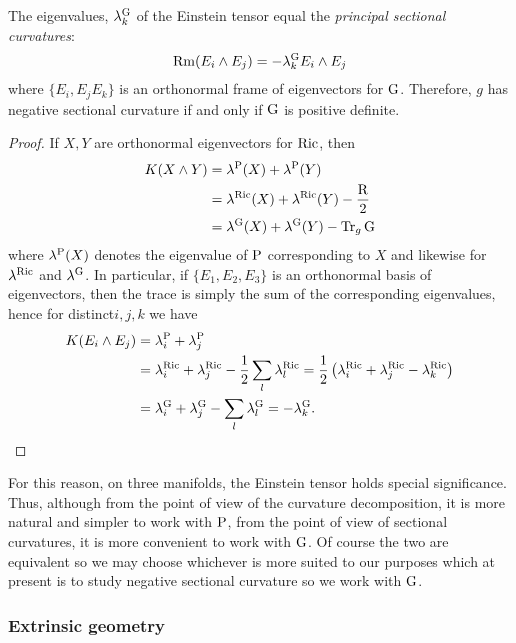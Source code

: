 \documentclass[a4paper, 12pt]{amsart}
\begin{document}
\begin{lemma}
\label{lem:eins_sectional}

The eigenvalues, \(\lambda^{\operatorname{G}}_k\) of the Einstein tensor equal the \emph{principal sectional curvatures}:
\[
\operatorname{Rm} (E_i \wedge E_j) = -\lambda^{\operatorname{G}}_k E_i \wedge E_j
\]
where \(\{E_i, E_j E_k\}\) is an orthonormal frame of eigenvectors for \(\operatorname{G}\). Therefore, \(g\) has negative sectional curvature if and only if \(\operatorname{G}\) is positive definite.
\end{lemma}

\begin{proof}
If \(X, Y\) are orthonormal eigenvectors for \(\operatorname{Ric}\), then
\begin{align*}
K(X \wedge Y) &= \lambda^{\operatorname{P}}(X) + \lambda^{\operatorname{P}}(Y) \\
&= \lambda^{\operatorname{Ric}} (X) + \lambda^{\operatorname{Ric}} (Y) - \frac{\operatorname{R}}{2} \\
&= \lambda^{\operatorname{G}} (X) + \lambda^{\operatorname{G}} (Y) - \operatorname{Tr}_g \operatorname{G} \\
\end{align*}
where \(\lambda^{\operatorname{P}}(X)\) denotes the eigenvalue of \(\operatorname{P}\) corresponding to \(X\) and likewise for \(\lambda^{\operatorname{Ric}}\) and \(\lambda^{\operatorname{G}}\). In particular, if \(\{E_1, E_2, E_3\}\) is an orthonormal basis of eigenvectors, then the trace is simply the sum of the corresponding eigenvalues, hence for distinct\(i,j,k\) we have
\begin{align*}
K(E_i \wedge E_j) &= \lambda^{\operatorname{P}}_i + \lambda^{\operatorname{P}}_j \\
&= \lambda^{\operatorname{Ric}}_i  + \lambda^{\operatorname{Ric}}_j - \frac{1}{2} \sum_l \lambda^{\operatorname{Ric}}_l = \frac{1}{2}\left(\lambda^{\operatorname{Ric}}_i + \lambda^{\operatorname{Ric}}_j -\lambda^{\operatorname{Ric}}_k\right) \\
&= \lambda^{\operatorname{G}}_i + \lambda^{\operatorname{G}}_j - \sum_l \lambda^{\operatorname{G}}_l = -\lambda^{\operatorname{G}}_k.
\end{align*}
\end{proof}

For this reason, on three manifolds, the Einstein tensor holds special significance. Thus, although from the point of view of the curvature decomposition, it is more natural and simpler to work with \(\operatorname{P}\), from the point of view of sectional curvatures, it is more convenient to work with \(\operatorname{G}\). Of course the two are equivalent so we may choose whichever is more suited to our purposes which at present is to study negative sectional curvature so we work with \(\operatorname{G}\).

\subsubsection{Extrinsic geometry}
\end{document}

